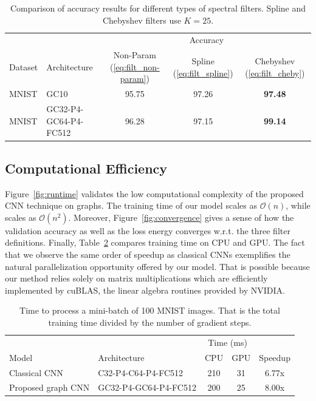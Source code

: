 \documentclass{article}
\newcommand{\bO}{\mathcal{O}}
\newcommand{\figref}[1]{Figure~\ref{fig:#1}}
\newcommand{\tabref}[1]{Table~\ref{tab:#1}}
\newcommand{\eqnref}[1]{(\ref{eq:#1})}
\newcommand{\bruna}{art:BrunaZarembaSzlamLeCun13DLgraphs,
art:HenaffBrunaLeCun15DLgraphs}
\newcommand{\todo}[1]{{\color{red} #1 }}
\begin{document}
\begin{table}[h!] \centering
\begin{tabular}{llccc} \toprule
& & \multicolumn{3}{c}{Accuracy} \\
\cmidrule{3-5}
Dataset & Architecture & Non-Param \eqnref{filt_non-param} &
Spline \eqnref{filt_spline} \cite{\bruna} &
Chebyshev \eqnref{filt_cheby} \\
\midrule
MNIST & GC10 & 95.75 & 97.26 & \textbf{97.48} \\
MNIST & GC32-P4-GC64-P4-FC512 & 96.28 & 97.15 & \textbf{99.14} \\
\bottomrule \end{tabular}
\caption{Comparison of accuracy results for different types of spectral filters.
Spline and Chebyshev filters use $K=25$.} %
\label{tab:filters}
\end{table}








\subsection{Computational Efficiency}


\figref{runtime} validates the low computational complexity of the proposed CNN technique on graphs. The training time of our model scales as $\bO(n)$, while \cite{\bruna} scales as $\bO(n^2)$. Moreover,
\figref{convergence} gives a sense of how the validation accuracy as well as the
loss energy converges w.r.t. the three filter definitions. Finally,
\tabref{speedup} compares training time on CPU and GPU. The fact that we observe
the same order of speedup as classical CNNs exemplifies the natural
parallelization opportunity offered by our model. That is possible because our
method relies solely on matrix multiplications which are efficiently implemented
by cuBLAS, the linear algebra routines provided by NVIDIA.

\begin{table}[ht] \centering
\begin{tabular}{llccc} \toprule
& & \multicolumn{2}{c}{Time (ms)} & \\
Model & Architecture & CPU & GPU & Speedup \\
\midrule
Classical CNN & C32-P4-C64-P4-FC512 & 210 & 31 & 6.77x \\
Proposed graph CNN & GC32-P4-GC64-P4-FC512 & 200 & 25 & 8.00x \\
\bottomrule \end{tabular}
\caption{Time to process a mini-batch of 100 MNIST images. That is the total
training time divided by the number of gradient steps.} 
\label{tab:speedup}
\end{table}
\end{document}
